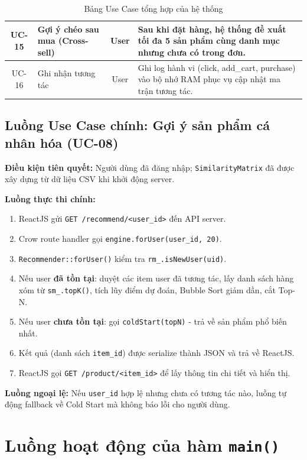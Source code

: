 \documentclass{report}
\begin{document}
\begin{table}[H]
\begin{tabularx}{\textwidth}{|c|>{\raggedright\arraybackslash}p{4.5cm}|c|>{\raggedright\arraybackslash}X|}
        UC-15 & Gợi ý chéo sau mua (Cross-sell) & User & Sau khi đặt hàng, hệ thống đề xuất tối đa 5 sản phẩm cùng danh mục nhưng chưa có trong đơn. \\ \hline
        UC-16 & Ghi nhận tương tác & User & Ghi log hành vi (click, add\_cart, purchase) vào bộ nhớ RAM phục vụ cập nhật ma trận tương tác. \\ \hline
    \end{tabularx}
    \caption{Bảng Use Case tổng hợp của hệ thống}
    \label{tab:use_case}
\end{table}

\subsection{Luồng Use Case chính: Gợi ý sản phẩm cá nhân hóa (UC-08)}

\textbf{Điều kiện tiên quyết:} Người dùng đã đăng nhập; \texttt{SimilarityMatrix} đã được xây dựng từ dữ liệu CSV khi khởi động server.

\textbf{Luồng thực thi chính:}
\begin{enumerate}
    \item ReactJS gửi \texttt{GET /recommend/<user\_id>} đến API server.
    \item Crow route handler gọi \texttt{engine.forUser(user\_id, 20)}.
    \item \texttt{Recommender::forUser()} kiểm tra \texttt{rm\_.isNewUser(uid)}.
    \item Nếu user \textbf{đã tồn tại}: duyệt các item user đã tương tác, lấy danh sách hàng xóm từ \texttt{sm\_.topK()}, tích lũy điểm dự đoán, Bubble Sort giảm dần, cắt Top-N.
    \item Nếu user \textbf{chưa tồn tại}: gọi \texttt{coldStart(topN)} - trả về sản phẩm phổ biến nhất.
    \item Kết quả (danh sách \texttt{item\_id}) được serialize thành JSON và trả về ReactJS.
    \item ReactJS gọi \texttt{GET /product/<item\_id>} để lấy thông tin chi tiết và hiển thị.
\end{enumerate}

\textbf{Luồng ngoại lệ:} Nếu \texttt{user\_id} hợp lệ nhưng chưa có tương tác nào, luồng tự động fallback về Cold Start mà không báo lỗi cho người dùng.

\section{Luồng hoạt động của hàm \texttt{main()}}
\end{document}
